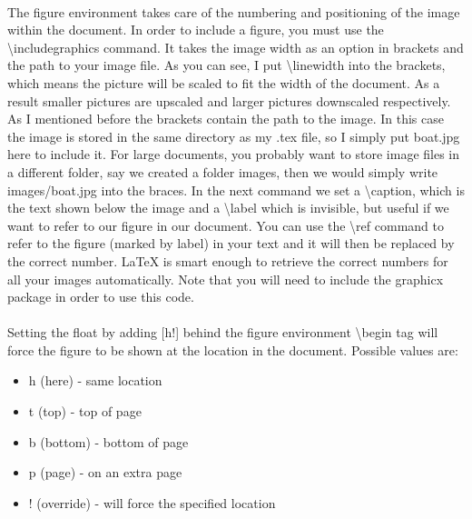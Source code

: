     \paragraph{ }
      The figure environment takes care of the numbering and 
      positioning of the image within the document. In order 
      to include a figure, you must use the \textbackslash includegraphics 
      command. It takes the image width as an option in brackets 
      and the path to your image file. As you can see, I 
      put \textbackslash linewidth into the brackets, which means
      the picture will be scaled to fit the width of the document. 
      As a result smaller pictures are upscaled and larger pictures 
      downscaled respectively. As I mentioned before the brackets 
      contain the path to the image. In this case the image is 
      stored in the same directory as my .tex file, so I simply 
      put boat.jpg here to include it. For large documents, you
      probably want to store image files in a different folder, 
      say we created a folder images, then we would simply write
      images/boat.jpg into the braces. In the next command we 
      set a \textbackslash caption, which is the text shown 
      below the image and a \textbackslash label which is 
      invisible, but useful if we want to refer to our figure 
      in our document. You can use the \textbackslash ref 
      command to refer to the figure (marked by label) in your
      text and it will then be replaced by the correct number. 
      LaTeX is smart enough to retrieve the correct numbers for 
      all your images automatically. Note that you will need to 
      include the graphicx package in order to use this code.

    \paragraph{ }
      Setting the float by adding [h!] behind the figure 
      environment \textbackslash begin tag 
      will force the figure to be shown at the location in 
      the document. Possible values are:
    \begin{itemize} %
      \item h (here) - same location
      \item t (top) - top of page
      \item b (bottom) - bottom of page
      \item p (page) - on an extra page
      \item ! (override) - will force the specified location
    \end{itemize} 


